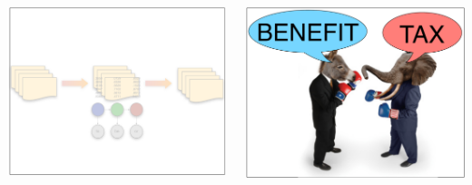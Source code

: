 \documentclass[compress]{beamer}
\begin{document}
\begin{frame}
  \begin{columns}
    \begin{center}
      \includegraphics[width=.85\linewidth]{cognitive/algorithms_off}
      \end{center}
    \begin{center}
      \includegraphics[width=.85\linewidth]{cognitive/framing_on}
      \end{center}
  \end{columns}



\end{frame}
\end{document}
